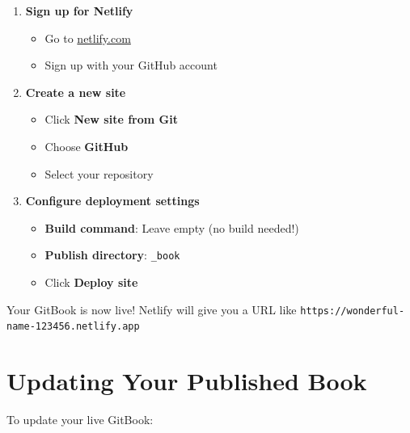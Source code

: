 \documentclass[
]{book}
\providecommand{\tightlist}{%
  \setlength{\itemsep}{0pt}\setlength{\parskip}{0pt}}
\begin{document}
\begin{enumerate}
\def\labelenumi{\arabic{enumi}.}
\tightlist
\item
  \textbf{Sign up for Netlify}

  \begin{itemize}
  \tightlist
  \item
    Go to \href{https://netlify.com}{netlify.com}
  \item
    Sign up with your GitHub account
  \end{itemize}
\item
  \textbf{Create a new site}

  \begin{itemize}
  \tightlist
  \item
    Click \textbf{New site from Git}
  \item
    Choose \textbf{GitHub}
  \item
    Select your repository
  \end{itemize}
\item
  \textbf{Configure deployment settings}

  \begin{itemize}
  \tightlist
  \item
    \textbf{Build command}: Leave empty (no build needed!)
  \item
    \textbf{Publish directory}: \texttt{\_book}
  \item
    Click \textbf{Deploy site}
  \end{itemize}
\end{enumerate}

Your GitBook is now live! Netlify will give you a URL like \texttt{https://wonderful-name-123456.netlify.app}

\section{Updating Your Published Book}\label{updating-your-published-book}

To update your live GitBook:
\end{document}
